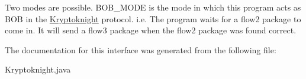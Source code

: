 Two modes are possible. BOB\_\-MODE is the mode in which this program acts as BOB in the \hyperlink{class_kryptoknight}{Kryptoknight} protocol. i.e. The program waits for a flow2 package to come in. It will send a flow3 package when the flow2 package was found correct. 

The documentation for this interface was generated from the following file:\begin{CompactItemize}
\item 
Kryptoknight.java\end{CompactItemize}
